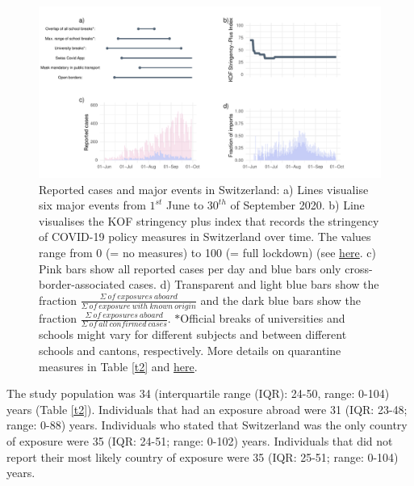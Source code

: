 \documentclass[10pt, a4paper, twoside]{article}
\begin{document}
\begin{multicols}{2}
\begin{figure}[h]
\centering
\includegraphics[scale=0.5]{Figure1_2021-04-19.pdf}
\caption{Reported cases and major events in Switzerland: 
a) Lines visualise six major events from $1^{st}$ June to $30^{th}$ of September 2020. 
b) Line visualises the KOF stringency plus index that records the stringency of COVID-19 policy measures in Switzerland over time. The values range from 0 (= no measures) to 100 (= full lockdown) (see \href{https://kof.ethz.ch/en/forecasts-and-indicators/indicators/kof-stringency-index.html}{here}. 
c) Pink bars show all reported cases per day and blue bars only cross-border-associated cases. 
d) Transparent and light blue bars show the fraction $\frac{\Sigma ~of~exposures~aboard }{\Sigma ~of~exposure~with~known~origin }$  and the dark blue bars show the fraction $\frac{\Sigma  ~of~exposures~aboard}{\Sigma ~of~all~confirmed~cases}$. $*$Official breaks of universities and schools might vary for different subjects and between different schools and cantons, respectively. More details on quarantine measures in Table \ref{t2} and \href{https://www.fedlex.admin.ch/eli/cc/2021/61/de}{here}.}
\label{f1}
\end{figure}

The study population was 34 (interquartile range (IQR): 24-50, range: 0-104) years (Table \ref{t2}).
Individuals that had an exposure abroad were 31 (IQR: 23-48; range: 0-88) years.
Individuals who stated that Switzerland was the only country of exposure were 35 (IQR: 24-51; range: 0-102) years.
Individuals that did not report their most likely country of exposure were 35 (IQR: 25-51; range: 0-104) years.


\end{multicols}
\end{document}
